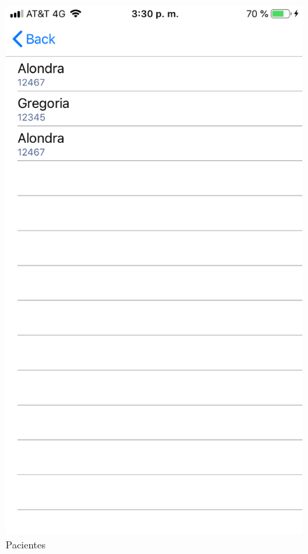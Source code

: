 \begin{enumerate}
	\begin{figure}[!htbp]			
		\hypertarget{fig:Pacientes}{\hspace{1pt}}
		\begin{center}
			\includegraphics[height=0.4\textheight]{Doctor/ConsultarPacientes/images/Pacientes}
			\caption{Pacientes}
			\label{fig:Pacientes}
		\end{center}
	\end{figure}
	

\end{enumerate}

